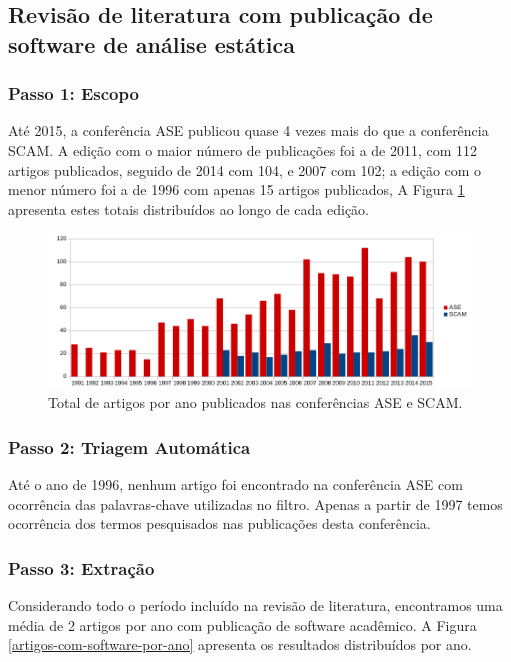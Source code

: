 \subsection{Revisão de literatura com publicação de software de análise estática}

\subsubsection{Passo 1: Escopo}

Até 2015, a conferência ASE publicou quase 4 vezes mais do que a conferência SCAM.
A edição com o maior número de publicações foi a de 2011, com 112 artigos publicados,
seguido de 2014 com 104, e 2007 com 102;  a edição com o menor número foi a de 1996
com apenas 15 artigos publicados, A Figura \ref{artigos-por-ano} apresenta estes
totais distribuídos ao longo de cada edição.

\begin{figure}[h]
  \center
  \includegraphics[scale=0.65]{imagens/artigos-por-ano.png}
  \caption{Total de artigos por ano publicados nas conferências ASE e SCAM.}
  \label{artigos-por-ano}
\end{figure}

\subsubsection{Passo 2: Triagem Automática}

Até o ano de 1996, nenhum artigo foi encontrado na conferência ASE com
ocorrência das palavras-chave utilizadas no filtro. Apenas a partir de 1997
temos ocorrência dos termos pesquisados nas publicações desta conferência.

\subsubsection{Passo 3: Extração}

Considerando todo o período incluído na revisão de literatura, encontramos uma
média de 2 artigos por ano com publicação de software acadêmico. A Figura
\ref{artigos-com-software-por-ano} apresenta os resultados distribuídos por
ano.

